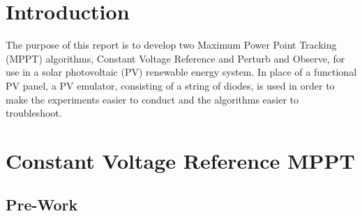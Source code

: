 \documentclass[]{article}
\begin{document}
	
	
	\tableofcontents
	\newpage
	\listoffigures
	\newpage
	\section{Introduction}
		The purpose of this report is to develop two Maximum Power Point Tracking (MPPT) algorithms, Constant Voltage Reference and Perturb and Observe, for use in a solar photovoltaic (PV) renewable energy system. In place of a functional PV panel, a PV emulator, consisting of a string of diodes, is used in order to make the experiments easier to conduct and the algorithms easier to troubleshoot.

	 	
 	\section{Constant Voltage Reference MPPT}
		\subsection{Pre-Work}
\end{document}
